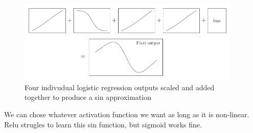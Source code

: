 \documentclass[twoside,11pt]{report}
\begin{document}
\begin{figure}
    \begin{center}
        \includegraphics[width=0.95\textwidth]{tikzfigures/universal.pdf}
    \end{center}
    \caption{Four indivudual logistic regression outputs scaled and added together to produce 
    a sin approximation}\label{fig:universal}
\end{figure}


We can chose whatever activation function we want as long as it is non-linear. Relu strugles to learn this 
sin function, but sigmoid works fine.










\vskip 0.2in

% 

\end{document}
